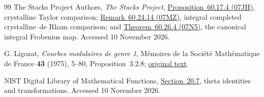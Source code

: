 \documentclass[11pt,a4paper]{article}
\begin{document}
\begin{thebibliography}{99}
The Stacks Project Authors, \emph{The Stacks Project},
\href{https://stacks.math.columbia.edu/tag/07JH}{Proposition~60.17.4 (07JH)},
crystalline Taylor comparison;
\href{https://stacks.math.columbia.edu/tag/07MZ}{Remark~60.24.14 (07MZ)},
integral completed crystalline--de Rham comparison; and
\href{https://stacks.math.columbia.edu/tag/07N5}{Theorem~60.26.4 (07N5)},
the canonical integral Frobenius map. Accessed 10 November 2026.

G. Ligozat, \emph{Courbes modulaires de genre 1},
M\'emoires de la Soci\'et\'e Math\'ematique de France \textbf{43} (1975),
5--80, Proposition~3.2.8;
\href{https://www.numdam.org/article/MSMF_1975__43__5_0.pdf}{original text}.

NIST Digital Library of Mathematical Functions,
\href{https://dlmf.nist.gov/20.7}{Section~20.7}, theta identities and
transformations. Accessed 10 November 2026.
\end{thebibliography}
\end{document}

